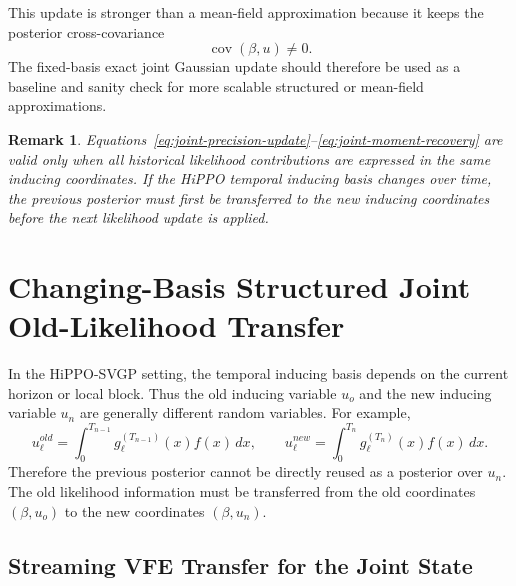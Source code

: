 \documentclass[12pt]{article}
\newtheorem{remark}{Remark}
\newcommand{\cov}{\operatorname{cov}}
\begin{document}
This update is stronger than a mean-field approximation because it keeps the posterior
cross-covariance
\begin{equation}
\cov(\beta,u)\neq 0.
\end{equation}
The fixed-basis exact joint Gaussian update should therefore be used as a baseline and
sanity check for more scalable structured or mean-field approximations.

\begin{remark}
Equations~\eqref{eq:joint-precision-update}--\eqref{eq:joint-moment-recovery} are valid
only when all historical likelihood contributions are expressed in the same inducing
coordinates. If the HiPPO temporal inducing basis changes over time, the previous
posterior must first be transferred to the new inducing coordinates before the next
likelihood update is applied.
\end{remark}


\section{Changing-Basis Structured Joint Old-Likelihood Transfer}
\label{sec:changing_basis_transfer}

In the HiPPO-SVGP setting, the temporal inducing basis depends on the current
horizon or local block. Thus the old inducing variable $u_o$ and the new
inducing variable $u_n$ are generally different random variables. For example,
\begin{equation}
    u_{\ell}^{old}
    =
    \int_0^{T_{n-1}} g_\ell^{(T_{n-1})}(x)f(x)\,dx,
    \qquad
    u_{\ell}^{new}
    =
    \int_0^{T_n} g_\ell^{(T_n)}(x)f(x)\,dx .
\end{equation}
Therefore the previous posterior cannot be directly reused as a posterior over
$u_n$. The old likelihood information must be transferred from the old
coordinates $(\beta,u_o)$ to the new coordinates $(\beta,u_n)$.

\subsection{Streaming VFE Transfer for the Joint State}
\label{subsec:streaming_vfe_transfer}
\end{document}
